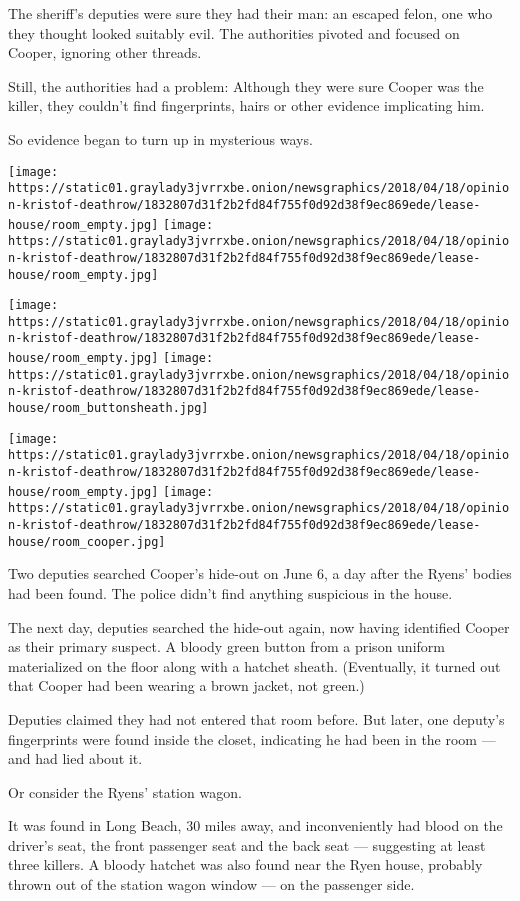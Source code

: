 The sheriff's deputies were sure they had their man: an escaped felon,
one who they thought looked suitably evil. The authorities pivoted and
focused on Cooper, ignoring other threads.

Still, the authorities had a problem: Although they were sure Cooper was
the killer, they couldn't find fingerprints, hairs or other evidence
implicating him.

So evidence began to turn up in mysterious ways.

\texttt{[image: https://static01.graylady3jvrrxbe.onion/newsgraphics/2018/04/18/opinion-kristof-deathrow/1832807d31f2b2fd84f755f0d92d38f9ec869ede/lease-house/room\_empty.jpg]}
\texttt{[image: https://static01.graylady3jvrrxbe.onion/newsgraphics/2018/04/18/opinion-kristof-deathrow/1832807d31f2b2fd84f755f0d92d38f9ec869ede/lease-house/room\_empty.jpg]}

\texttt{[image: https://static01.graylady3jvrrxbe.onion/newsgraphics/2018/04/18/opinion-kristof-deathrow/1832807d31f2b2fd84f755f0d92d38f9ec869ede/lease-house/room\_empty.jpg]}
\texttt{[image: https://static01.graylady3jvrrxbe.onion/newsgraphics/2018/04/18/opinion-kristof-deathrow/1832807d31f2b2fd84f755f0d92d38f9ec869ede/lease-house/room\_buttonsheath.jpg]}

\texttt{[image: https://static01.graylady3jvrrxbe.onion/newsgraphics/2018/04/18/opinion-kristof-deathrow/1832807d31f2b2fd84f755f0d92d38f9ec869ede/lease-house/room\_empty.jpg]}
\texttt{[image: https://static01.graylady3jvrrxbe.onion/newsgraphics/2018/04/18/opinion-kristof-deathrow/1832807d31f2b2fd84f755f0d92d38f9ec869ede/lease-house/room\_cooper.jpg]}

Two deputies searched Cooper's hide-out on June 6, a day after the
Ryens' bodies had been found. The police didn't find anything suspicious
in the house.

The next day, deputies searched the hide-out again, now having
identified Cooper as their primary suspect. A bloody green button from a
prison uniform materialized on the floor along with a hatchet sheath.
(Eventually, it turned out that Cooper had been wearing a brown jacket,
not green.)

Deputies claimed they had not entered that room before. But later, one
deputy's fingerprints were found inside the closet, indicating he had
been in the room --- and had lied about it.

 Or consider the Ryens' station wagon.

It was found in Long Beach, 30 miles away, and inconveniently had blood
on the driver's seat, the front passenger seat and the back seat ---
suggesting at least three killers. A bloody hatchet was also found near
the Ryen house, probably thrown out of the station wagon window --- on
the passenger side.

